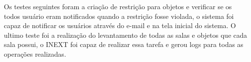 \par
Os testes seguintes foram a criação de restrição para objetos e verificar se os todos usuário eram notificados quando a restrição fosse violada, o sistema foi capaz de notificar os usuários através do e-mail e na tela inicial do sistema. O ultimo teste foi a realização do levantamento de todas as salas e objetos que cada sala possui, o INEXT foi capaz de realizar essa tarefa e gerou logs para todas as operações realizadas.
